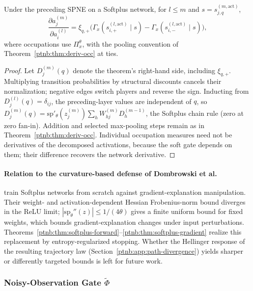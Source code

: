 \begin{theoremenv}\label{ptnb:thm:softplus-gradient}
Under the preceding SPNE on a Softplus network, for $l\le m$ and $s=s_{j,q}^{(m,\mathrm{act})}$,
\begin{equation}
    \frac{\partial a_j^{(m)}}{\partial a_i^{(l)}}=
    \xi_{q,+}\bigl(\Gamma_x(s_{i,+}^{(l,\mathrm{act})}\mid s)
                 -\Gamma_x(s_{i,-}^{(l,\mathrm{act})}\mid s)\bigr),
\end{equation}
where occupations use $\Pi_x^\theta$, with the pooling convention of
Theorem~\ref{ptnb:thm:deriv-occ} at ties.
\end{theoremenv}
\begin{proof}
Let $D_j^{(m)}(q)$ denote the theorem's right-hand side, including $\xi_{q,+}$.
Multiplying transition probabilities by structural discounts cancels their normalization;
negative edges switch players and reverse the sign. Inducting from
$D_j^{(l)}(q)=\delta_{ij}$, the preceding-layer values are independent of $q$, so
$D_j^{(m)}(q)=\mathrm{sp}'_\theta(z_j^{(m)})\sum_hW_{hj}^{(m)}D_h^{(m-1)}$,
the Softplus chain rule (zero at zero fan-in). Addition and selected max-pooling steps remain as
in Theorem~\ref{ptnb:thm:deriv-occ}. Individual occupation measures need not be derivatives of the decomposed activations, because the soft gate depends on them; their difference recovers the network derivative.
\end{proof}

\paragraph{Relation to the curvature-based defense of Dombrowski et al.}\label{ptnb:app:softplus-dombrowski}
\textcite{Dombrowski2020} train Softplus networks from scratch against gradient-explanation
manipulation. Their weight- and activation-dependent Hessian Frobenius-norm bound diverges in the
ReLU limit; $|\mathrm{sp}_\theta''(z)|\le1/(4\theta)$ gives a finite uniform bound for fixed weights,
which bounds gradient-explanation changes under input perturbations.
Theorems~\ref{ptnb:thm:softplus-forward}--\ref{ptnb:thm:softplus-gradient} realize this replacement by
entropy-regularized stopping. Whether the Hellinger response of the resulting trajectory law (Section~\ref{ptnb:app:path-divergence}) yields sharper or differently targeted bounds is left for future work.

\subsubsection{Noisy-Observation Gate \texorpdfstring{$\tilde\Phi$}{Phi}}\label{ptnb:app:noisy-gate-mode}

